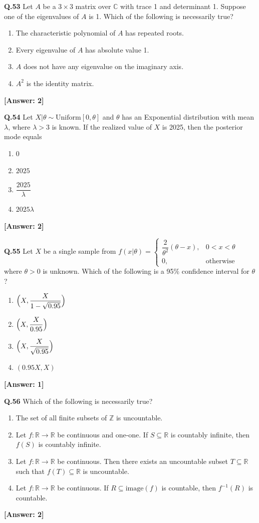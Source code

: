 \documentclass[12pt,a4paper]{article}
\newcommand{\ans}[1]{\quad\textcolor{anscolor}{\textbf{[Answer: #1]}}}
\begin{document}
\textbf{Q.53} Let $A$ be a $3\times3$ matrix over $\mathbb{C}$ with trace 1 and determinant 1. Suppose one of the eigenvalues of $A$ is 1. Which of the following is necessarily true?
\begin{enumerate}[label=\arabic*.]
\item The characteristic polynomial of $A$ has repeated roots.
\item Every eigenvalue of $A$ has absolute value 1.
\item $A$ does not have any eigenvalue on the imaginary axis.
\item $A^2$ is the identity matrix.
\end{enumerate}\ans{2}

\textbf{Q.54} Let $X|\theta\sim\text{Uniform}[0,\theta]$ and $\theta$ has an Exponential distribution with mean $\lambda$, where $\lambda>3$ is known. If the realized value of $X$ is 2025, then the posterior mode equals
\begin{enumerate}[label=\arabic*.]
\item $0$ \item $2025$ \item $\dfrac{2025}{\lambda}$ \item $2025\lambda$
\end{enumerate}\ans{2}

\textbf{Q.55} Let $X$ be a single sample from $f(x|\theta)=\begin{cases}\dfrac{2}{\theta^2}(\theta-x),&0<x<\theta\\0,&\text{otherwise}\end{cases}$ where $\theta>0$ is unknown. Which of the following is a 95\% confidence interval for $\theta$?
\begin{enumerate}[label=\arabic*.]
\item $\Bigl(X,\dfrac{X}{1-\sqrt{0.95}}\Bigr)$
\item $\Bigl(X,\dfrac{X}{0.95}\Bigr)$
\item $\Bigl(X,\dfrac{X}{\sqrt{0.95}}\Bigr)$
\item $(0.95X,X)$
\end{enumerate}\ans{1}

\textbf{Q.56} Which of the following is necessarily true?
\begin{enumerate}[label=\arabic*.]
\item The set of all finite subsets of $\mathbb{Z}$ is uncountable.
\item Let $f:\mathbb{R}\to\mathbb{R}$ be continuous and one-one. If $S\subseteq\mathbb{R}$ is countably infinite, then $f(S)$ is countably infinite.
\item Let $f:\mathbb{R}\to\mathbb{R}$ be continuous. Then there exists an uncountable subset $T\subseteq\mathbb{R}$ such that $f(T)\subseteq\mathbb{R}$ is uncountable.
\item Let $f:\mathbb{R}\to\mathbb{R}$ be continuous. If $R\subseteq\text{image}(f)$ is countable, then $f^{-1}(R)$ is countable.
\end{enumerate}\ans{2}
\end{document}
